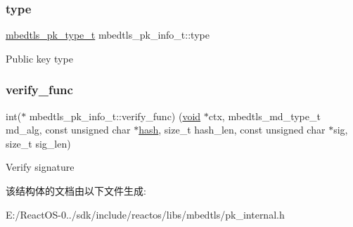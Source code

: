 \subsubsection{\texorpdfstring{type}{type}}
{\footnotesize\ttfamily \hyperlink{pk_8h_a3fe41eff5605ae727eb9d28dad297020}{mbedtls\+\_\+pk\+\_\+type\+\_\+t} mbedtls\+\_\+pk\+\_\+info\+\_\+t\+::type}

Public key type \mbox{\label{structmbedtls__pk__info__t_aba8b768e152806bc28322004a522dc0c}} 
\subsubsection{\texorpdfstring{verify\+\_\+func}{verify\_func}}
{\footnotesize\ttfamily int($\ast$ mbedtls\+\_\+pk\+\_\+info\+\_\+t\+::verify\+\_\+func) (\hyperlink{interfacevoid}{void} $\ast$ctx, mbedtls\+\_\+md\+\_\+type\+\_\+t md\+\_\+alg, const unsigned char $\ast$\hyperlink{structhash}{hash}, size\+\_\+t hash\+\_\+len, const unsigned char $\ast$sig, size\+\_\+t sig\+\_\+len)}

Verify signature 

该结构体的文档由以下文件生成\+:\begin{DoxyCompactItemize}
\item 
E\+:/\+React\+O\+S-\/0../sdk/include/reactos/libs/mbedtls/pk\+\_\+internal.\+h\end{DoxyCompactItemize}

